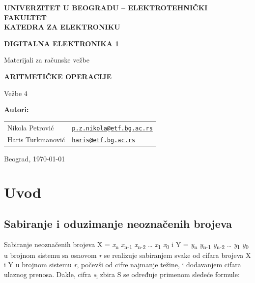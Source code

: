 \documentclass[a4paper,11pt]{article}
\numberwithin{equation}{section}
\begin{document}
\hypersetup{pageanchor=false}
\begin{titlepage}
\thispagestyle{empty}
\begin{center}
{\Large\bfseries UNIVERZITET U BEOGRADU -- ELEKTROTEHNIČKI FAKULTET\\ KATEDRA ZA ELEKTRONIKU\par}
\vspace{25mm}
{\LARGE\bfseries DIGITALNA ELEKTRONIKA 1\par}
\vspace{2mm}
{\large Materijali za računske vežbe\par}
\vspace{18mm}
{\Large\bfseries ARITMETIČKE OPERACIJE\par}
\vspace{3mm}
{\large Vežbe 4\par}
\vfill
\begin{minipage}{0.62\linewidth}
\raggedright\textbf{Autori:}\\[4pt]\small
\begin{tabular}{@{}ll@{}}
Nikola Petrović & \href{mailto:p.z.nikola@etf.bg.ac.rs}{\texttt{p.z.nikola@etf.bg.ac.rs}}\\
Haris Turkmanović & \href{mailto:haris@etf.bg.ac.rs}{\texttt{haris@etf.bg.ac.rs}}\\
\end{tabular}
\end{minipage}\hfill
\begin{minipage}{0.34\linewidth}\raggedleft Beograd, \today\end{minipage}
\end{center}
\end{titlepage}
\hypersetup{pageanchor=true}
\tableofcontents
\newpage

\FloatBarrier
\section{Uvod}\label{sec:1}


\FloatBarrier
\subsection{Sabiranje i oduzimanje neoznačenih brojeva}\label{sec:1.1}


Sabiranje neoznačenih brojeva X = \emph{x}\textsubscript{n} \emph{x}\textsubscript{n-1} \emph{x}\textsubscript{n-2} \ldots{} \emph{x}\textsubscript{1} \emph{x}\textsubscript{0} i Y = \emph{y}\textsubscript{n} \emph{y}\textsubscript{n-1} \emph{y}\textsubscript{n-2} \ldots{} \emph{y}\textsubscript{1} \emph{y}\textsubscript{0} u brojnom sistemu sa osnovom \emph{r} se realizuje sabiranjem svake od cifara brojeva X i Y u brojnom sistemu \emph{r}, počevši od cifre najmanje težine, i dodavanjem cifara ulaznog prenosa. Dakle, cifra \emph{s}\textsubscript{i} zbira S se određuje primenom sledeće formule:
\end{document}
